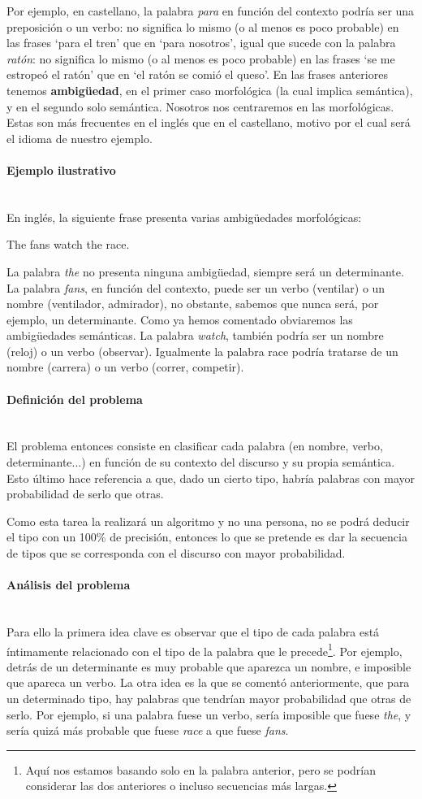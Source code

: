 \documentclass{article}
\newcommand{\myparagraph}[1]{\paragraph{#1}\mbox{}\\}
\begin{document}
Por ejemplo, en castellano, la palabra \textit{para} en función del contexto podría ser una preposición o un verbo: no significa lo mismo (o al menos es poco probable) en las frases `para el tren' que en `para nosotros', igual que sucede con la palabra \textit{ratón}: no significa lo mismo (o al menos es poco probable) en las frases `se me estropeó el ratón' que en `el ratón se comió el queso'. En las frases anteriores tenemos \textbf{ambigüedad}, en el primer caso morfológica (la cual implica semántica), y en el segundo solo semántica. Nosotros nos centraremos en las morfológicas. Estas son más frecuentes en el inglés que en el castellano, motivo por el cual será el idioma de nuestro ejemplo. 

\myparagraph{Ejemplo ilustrativo}

En inglés, la siguiente frase presenta varias ambigüedades morfológicas:

\begin{center}
    The fans watch the race.
\end{center}

La palabra \textit{the} no presenta ninguna ambigüedad, siempre será un determinante. La palabra \textit{fans}, en función del contexto, puede ser un verbo (ventilar) o un nombre (ventilador, admirador), no obstante, sabemos que nunca será, por ejemplo, un determinante. Como ya hemos comentado obviaremos las ambigüedades semánticas. La palabra \textit{watch}, también podría ser un nombre (reloj) o un verbo (observar). Igualmente la palabra race podría tratarse de un nombre (carrera) o un verbo (correr, competir). 

\myparagraph{Definición del problema}

El problema entonces consiste en clasificar cada palabra (en nombre, verbo, determinante...) en función de su contexto del discurso y su propia semántica. Esto último hace referencia a que, dado un cierto tipo, habría palabras con mayor probabilidad de serlo que otras.

Como esta tarea la realizará un algoritmo y no una persona, no se podrá deducir el tipo con un 100\% de precisión, entonces lo que se pretende es dar la secuencia de tipos que se corresponda con el discurso con mayor probabilidad.

\myparagraph{Análisis del problema}

Para ello la primera idea clave es observar que el tipo de cada palabra está íntimamente relacionado con el tipo de la palabra que le precede\footnote{Aquí nos estamos basando solo en la palabra anterior, pero se podrían considerar las dos anteriores o incluso secuencias más largas.}. Por ejemplo, detrás de un determinante es muy probable que aparezca un nombre, e imposible que apareca un verbo. La otra idea es la que se comentó anteriormente, que para un determinado tipo, hay palabras que tendrían mayor probabilidad que otras de serlo. Por ejemplo, si una palabra fuese un verbo, sería imposible que fuese \textit{the}, y sería quizá más probable que fuese 
\textit{race} a que fuese \textit{fans}. \\
\end{document}
